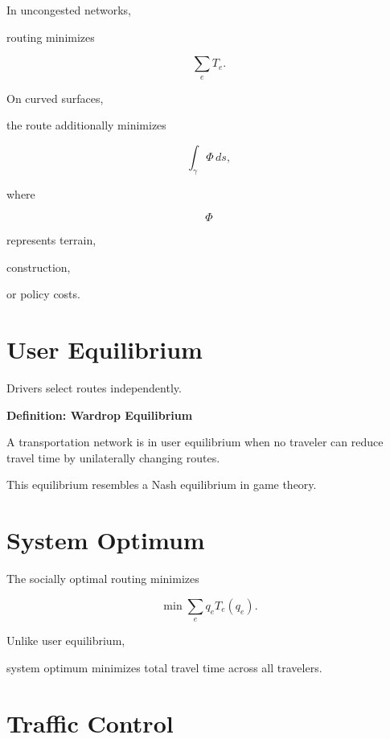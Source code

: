 \documentclass[11pt,fleqn]{book}
\numberwithin{equation}{chapter}
\newenvironment{definition}[1]
  {\begin{definitionEnv}
   \noindent\textbf{Definition: #1}\par\smallskip}
  {\end{definitionEnv}}
\theoremstyle{plain}
\theoremstyle{definition}
\theoremstyle{remark}
\begin{document}
In uncongested networks,

routing minimizes

\[
\sum_e
T_e.
\]

On curved surfaces,

the route additionally minimizes

\[
\int_\gamma
\Phi
\,ds,
\]

where

\[
\Phi
\]

represents terrain,

construction,

or policy costs.


\section{User Equilibrium}

Drivers select routes independently.


\begin{definition}{Wardrop Equilibrium}

A transportation network is in user equilibrium when no traveler can
reduce travel time by unilaterally changing routes.

\end{definition}

This equilibrium resembles a Nash equilibrium in game theory.


\section{System Optimum}

The socially optimal routing minimizes

\[
\boxed{
\min
\sum_e
q_e
T_e(q_e).
}
\]

Unlike user equilibrium,

system optimum minimizes total travel time across all travelers.


\section{Traffic Control}
\end{document}

